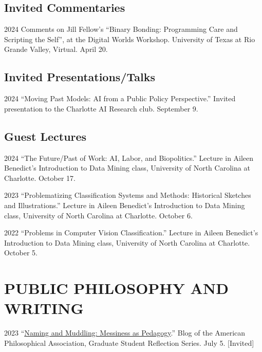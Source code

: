 \documentclass{article}
\begin{document}
\subsection*{\normalsize{Invited Commentaries}}
\begin{tablist}
    \item[2024] \tab{}Comments on Jill Fellow's \enquote{Binary Bonding: Programming Care and Scripting the Self}, at the Digital Worlds Workshop. University of Texas at Rio Grande Valley, Virtual. April 20.
\end{tablist}

\subsection*{\normalsize{Invited Presentations/Talks}}
\begin{tablist}
    \item[2024] \tab{}\enquote{Moving Past Models: AI from a Public Policy Perspective.} Invited presentation to the Charlotte AI Research club. September 9.
\end{tablist}

\subsection*{\normalsize{Guest Lectures}}
\begin{tablist}
    \item[2024] \tab{}\enquote{The Future/Past of Work: AI, Labor, and Biopolitics.} Lecture in Aileen Benedict's Introduction to Data Mining class, University of North Carolina at Charlotte. October 17.
    \item[2023] \tab{}\enquote{Problematizing Classification Systems and Methods: Historical Sketches and Illustrations.} Lecture in Aileen Benedict's Introduction to Data Mining class, University of North Carolina at Charlotte. October 6.
    \item[2022] \tab{}\enquote{Problems in Computer Vision Classification.} Lecture in Aileen Benedict's Introduction to Data Mining class, University of North Carolina at Charlotte. October 5.
\end{tablist}


\section*{\normalsize{PUBLIC PHILOSOPHY AND WRITING}}
\begin{tablist}
    \item[2023] \tab{}\enquote{\href{https://blog.apaonline.org/2023/07/05/naming-and-muddling-messiness-as-pedagogy/}{Naming and Muddling: Messiness as Pedagogy}.} Blog of the American Philosophical Association, Graduate Student Reflection Series. July 5. [Invited]
\end{tablist}
\end{document}
